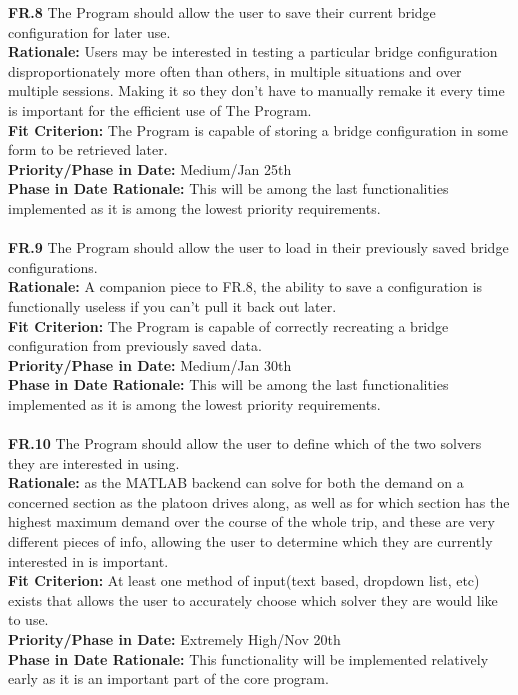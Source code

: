 \documentclass[12pt]{article}
\begin{document}
  \noindent\textbf{FR.8} The Program should allow the user to save their current bridge configuration for later use.\\
  \textbf{Rationale:} Users may be interested in testing a particular bridge configuration disproportionately more often than others, in multiple situations
   and over multiple sessions. Making it so they don't have to manually remake it every time is important for the efficient use of The Program.\\
  \textbf{Fit Criterion:} The Program is capable of storing a bridge configuration in some form to be retrieved later.\\
  \textbf{Priority/Phase in Date:} Medium/Jan 25th\\
  \textbf{Phase in Date Rationale:} This will be among the last functionalities implemented as it is among the lowest priority requirements.\\\\

  \noindent\textbf{FR.9} The Program should allow the user to load in their previously saved bridge configurations.\\
  \textbf{Rationale:} A companion piece to FR.8, the ability to save a configuration is functionally useless if you can't pull it back out later.\\
  \textbf{Fit Criterion:} The Program is capable of correctly recreating a bridge configuration from previously saved data.\\
  \textbf{Priority/Phase in Date:} Medium/Jan 30th\\
  \textbf{Phase in Date Rationale:} This will be among the last functionalities implemented as it is among the lowest priority requirements.\\\\

  \noindent\textbf{FR.10} The Program should allow the user to define which of the two solvers they are interested in using.\\
  \textbf{Rationale:} as the MATLAB backend can solve for both the demand on a concerned section as the platoon drives along, as well as for which section has the 
  highest maximum demand over the course of the whole trip, and these are very different pieces of info, allowing the user to determine which they are currently interested in 
  is important.\\
  \textbf{Fit Criterion:} At least one method of input(text based, dropdown list, etc) exists that allows the user to accurately choose which solver they are would like to use.\\
  \textbf{Priority/Phase in Date:} Extremely High/Nov 20th\\
  \textbf{Phase in Date Rationale:} This functionality will be implemented relatively early as it is an important part of the core program.\\\\
\end{document}
